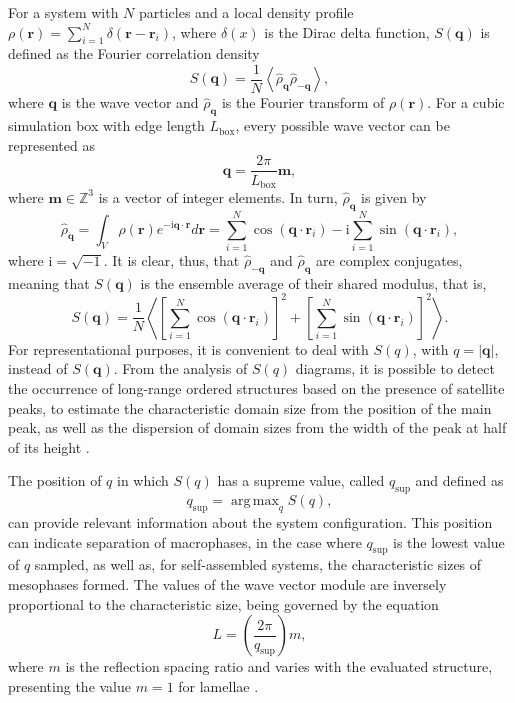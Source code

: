 \documentclass[
aip,
jcp,
reprint,
]{revtex4-1}
\DeclareMathOperator*{\argmax}{arg\,max}
\newcommand{\vt}[1]{\boldsymbol{\mathbf{#1}}}          %
\begin{document}
For a system with $N$ particles and a local density profile $\rho(\vt r) = \sum_{i=1}^N \delta(\vt r - \vt r_i)$, where $\delta(x)$ is the Dirac delta function, $S(\vt q)$ is defined as the Fourier correlation density
\begin{equation}
S(\vt q) = \frac{1}{N} \left\langle \hat{\rho}_{\vt q} \hat{\rho}_{-\vt q} \right\rangle,
\end{equation}
where $\vt q$ is the wave vector and $\hat{\rho}_{\vt q}$ is the Fourier transform of $\rho(\vt r)$.
For a cubic simulation box with edge length $L_\mathrm{box}$, every possible wave vector can be represented as
\begin{equation}
\vt q = \frac{2 \pi}{L_\mathrm{box}} {\vt m},
\end{equation}
where ${\vt m} \in \mathbb{Z}^3$ is a vector of integer elements.
In turn, $\hat{\rho}_{\vt q}$ is given by
\begin{equation}
\hat{\rho}_{\vt q} = \int_V {\rho}({\vt r}) e^{-\mathrm{i} {\vt q} \cdot \vt r} d{\vt r} = \sum_{i=1}^N \cos(\vt q \cdot \vt r_i) -\mathrm{i}  \sum_{i=1}^N \sin(\vt q \cdot \vt r_i),
\end{equation}
where $\mathrm{i} = \sqrt{-1}$.
It is clear, thus, that $\hat{\rho}_{-\vt q}$ and $\hat{\rho}_{\vt q}$ are complex conjugates, meaning that $S(\vt q)$ is the ensemble average of their shared modulus, that is, \cite{Zhang_2016}
\begin{equation}
S(\vt q) = \frac{1}{N} \left\langle \left[\sum_{i=1}^N \cos(\vt q \cdot \vt r_i)\right]^2 + \left[\sum_{i=1}^N \sin(\vt q \cdot \vt r_i)\right]^2 \right\rangle.
\end{equation}
For representational purposes, it is convenient to deal with $S(q)$, with $q = |\vt q|$, instead of $S(\vt q)$.
From the analysis of $S(q)$ diagrams, it is possible to detect the occurrence of long-range ordered structures based on the presence of satellite peaks, to estimate the characteristic domain size from the position of the main peak, as well as the dispersion of domain sizes from the width of the peak at half of its height \cite{Gavrilov_2013}.

The position of $q$ in which $S(q)$ has a supreme value, called $q_\mathrm{sup}$ and defined as
\begin{equation}
\label{eq:q_sup definition}
q_\mathrm{sup} = \argmax_q S(q),
\end{equation}
can provide relevant information about the system configuration.
This position can indicate separation of macrophases, in the case where $q_\mathrm{sup}$ is the lowest value of $q$ sampled, as well as, for self-assembled systems, the characteristic sizes of mesophases formed.
The values of the wave vector module  are inversely proportional to the characteristic size, being governed by the equation
\begin{equation}
\label{eq:characteristic size}
L = \left(\frac{2 \pi}{q_\mathrm{sup}}\right) m,
\end{equation}
where $m$ is the reflection spacing ratio and varies with the evaluated structure, presenting the value $m=1$ for lamellae \cite{Martinez-Veracoechea_2005}.
\end{document}
